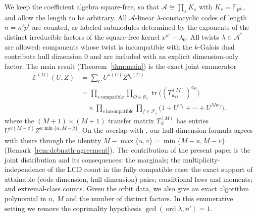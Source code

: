 \documentclass[preprint,12pt,a4paper]{elsarticle}
\newcommand{\F}{\mathbb F}
\newcommand{\A}{\mathcal A}
\newcommand{\Fs}{\mathcal F_s}
\newcommand{\Os}{\mathcal O_s}
\newcommand{\Epoly}{\mathscr E}
\theoremstyle{definition}
\theoremstyle{remark}
\begin{document}
We keep the coefficient algebra square-free, so that
$\A\cong\prod_s K_s$ with $K_s=\F_{p^{d_s}}$, and allow the length to be
arbitrary. All $\A$-linear $\lambda$-constacyclic codes of length $n=n'p^t$
are counted, as labeled submodules determined by the exponents of the
distinct irreducible factors of the square-free kernel $x^{n'}-\lambda_0$.
All twists $\lambda\in\A^\ast$ are allowed: components whose twist is
incompatible with the $k$-Galois dual contribute hull dimension $0$ and are
included with an explicit dimension-only factor. The main result
(Theorem~\ref{thm:main}) is the exact joint enumerator
{\small
\begin{align*}
\Epoly^{(M)}(U,Z)
&= \sum_C U^{\kappa(C)} Z^{\eta_k(C)}\\
&= \prod_{s\ \mathrm{compatible}}
   \prod_{O\in\Os}
   \operatorname{tr}\!\bigl((T^{(M)}_{w_O})^{a_O}\bigr)
   \\[3pt]
&\quad{}\times
   \prod_{s\ \mathrm{incompatible}}
   \prod_{f\in\Fs}
   \bigl(1+U^{w_f}+\cdots+U^{Mw_f}\bigr).
\end{align*}
}
where the $(M+1)\times(M+1)$ transfer matrix $T^{(M)}_w$ has entries
$U^{w(M-\beta)}Z^{w\min\{\alpha,M-\beta\}}$. On the overlap with
\cite{debnathAffine2026}, our hull-dimension formula agrees with theirs
through the identity $M-\max\{u,v\}=\min\{M-u,M-v\}$
(Remark~\ref{rem:debnath-agreement}). The contribution of the present paper
is the joint distribution and its consequences: the marginals; the
multiplicity-independence of the LCD count in the fully compatible case;
the exact support of attainable (code dimension, hull dimension) pairs;
conditional laws and moments; and extremal-class counts. Given the orbit
data, we also give an exact algorithm polynomial in $n$, $M$ and the number of
distinct factors. In this enumerative setting we remove the coprimality
hypothesis $\gcd(\operatorname{ord}\lambda,n')=1$.
\end{document}
